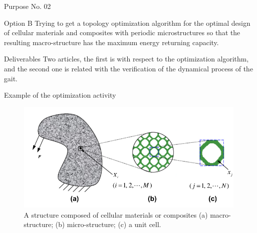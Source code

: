 \documentclass[10pt]{beamer}
\begin{document}
\begin{frame}{Purpose No. 02}
	\begin{block}{Option B}
	Trying to get a topology optimization algorithm for the optimal design of cellular materials and composites with periodic microstructures so that the resulting macro-structure has the maximum energy returning capacity. 
	\end{block}
	\begin{exampleblock}{Deliverables}
	Two articles, the first is with respect to the optimization algorithm, and the second one is related with the verification of the dynamical process of the gait.
	\end{exampleblock}
\end{frame}

\begin{frame}{Example of the optimization activity}
\begin{figure}[H]
\begin{centering}
\includegraphics[scale=0.35]{optimiTopo.png}
\par\end{centering}

\caption{\label{fig:N=2} A structure composed of cellular materials or composites (a) macro-structure; (b) micro-structure; (c) a unit cell.}

\end{figure}
\end{frame}
\end{document}
